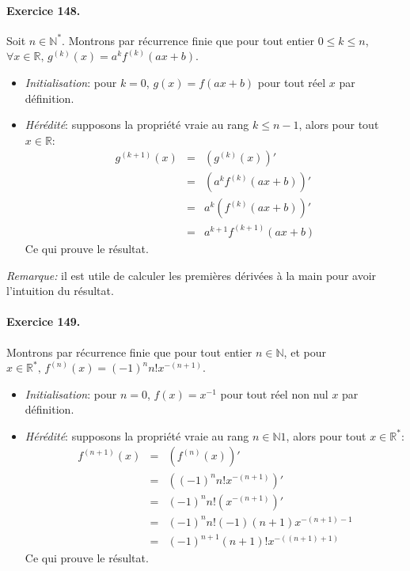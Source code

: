\documentclass[a4paper,11pt]{article}
\begin{document}
\paragraph{Exercice 148.} Soit $n \in \mathbb{N}^*$. Montrons par récurrence finie que pour tout entier $0 \leq k \leq n$, $\forall x\in \mathbb{R}, \, g^{(k)}(x)=a^kf^{(k)}(ax+b)$.
\begin{itemize}
  \item \textit{Initialisation}: pour $k=0$, $g(x)=f(ax+b)$ pour tout réel $x$ par définition.
  \item \textit{Hérédité}: supposons la propriété vraie au rang $k \leq n-1$, alors pour tout $x \in \mathbb{R}$:
  \begin{eqnarray}
    g^{(k+1)}(x) &=& \left( g^{(k)}(x) \right)'  \nonumber \\
                &=& \left( a^kf^{(k)}(ax+b) \right)'  \nonumber \\
                &=& a^k \left( f^{(k)}(ax+b) \right)'  \nonumber \\
                &=& a^{k+1} f^{(k+1)}(ax+b)  \nonumber 
  \end{eqnarray}
  Ce qui prouve le résultat.
\end{itemize}

\textit{Remarque:} il est utile de calculer les premières dérivées à la main pour avoir l'intuition du résultat.

\paragraph{Exercice 149.} Montrons par récurrence finie que pour tout entier $n\in \mathbb{N}$, et pour $x\in \mathbb{R}^*, \, f^{(n)}(x)=(-1)^nn!x^{-(n+1)}$.
\begin{itemize}
  \item \textit{Initialisation}: pour $n=0$, $f(x)=x^{-1}$ pour tout réel non nul $x$ par définition.
  \item \textit{Hérédité}: supposons la propriété vraie au rang $n\in \mathbb{N}1$, alors pour tout $x \in \mathbb{R}^*$:
  \begin{eqnarray}
    f^{(n+1)}(x) &=& \left( f^{(n)}(x) \right)'  \nonumber \\
                &=& \left( (-1)^nn!x^{-(n+1)} \right)'  \nonumber \\
                &=& (-1)^nn! \left( x^{-(n+1)} \right)'  \nonumber \\
                &=& (-1)^nn!(-1)(n+1) x^{-(n+1)-1} \nonumber \\
                &=& (-1)^{n+1}(n+1)!x^{-((n+1)+1)} \nonumber 
  \end{eqnarray}
  Ce qui prouve le résultat.
\end{itemize}
\end{document}
